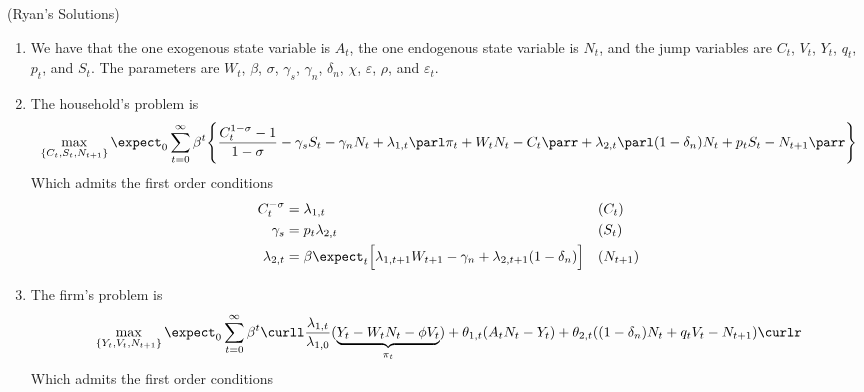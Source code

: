 \documentclass[10pt]{article}
\begin{document}
(Ryan's Solutions)

\begin{enumerate}
	\item We have that the one exogenous state variable is $A_t$, the one endogenous state variable is $N_t$, and the jump variables are $C_t$, $V_t$, $Y_t$, $q_t$, $p_t$, and $S_t$. The parameters are $W_t$, $\beta$, $\sigma$, $\gamma_s$, $\gamma_n$, $\delta_n$, $\chi$, $\varepsilon$, $\rho$, and $\varepsilon_t$.
	\item The household's problem is
	\[
	\max_{\{C_t,S_t,N_{t+1}\}} \expect_0 \sum_{t=0}^\infty \beta^t \Bigg\{ \frac{C_t^{1-\sigma} - 1}{1-\sigma} - \gamma_s S_t - \gamma_n N_t + \lambda_{1,t}\parl \pi_t + W_tN_t - C_t\parr + \lambda_{2,t}\parl (1-\delta_n) N_t + p_tS_t - N_{t+1}\parr\Bigg\}
	\]
	Which admits the first order conditions
	\begin{align*}
		C_t^{-\sigma} &= \lambda_{1,t} &&(C_t) \\
		\gamma_s &= p_t\lambda_{2,t} &&(S_t) \\
		\lambda_{2,t} &= \beta \expect_{t}\Big[ \lambda_{1,t+1} W_{t+1} - \gamma_n + \lambda_{2,t+1}(1-\delta_n)  \Big] &&(N_{t+1})
	\end{align*}
	\item The firm's problem is 
	\[
	\max_{\{Y_t,V_t,N_{t+1}\}} \expect_0 \sum_{t=0}^\infty \beta^t \curll \frac{\lambda_{1,t}}{\lambda_{1,0}} (\underbrace{Y_t - W_tN_t - \phi V_t}_{\pi_t}) + \theta_{1,t}(A_tN_t - Y_t) + \theta_{2,t} ((1-\delta_n)N_t + q_tV_t - N_{t+1})\curlr 
	\]
	Which admits the first order conditions
\end{enumerate}
\end{document}
